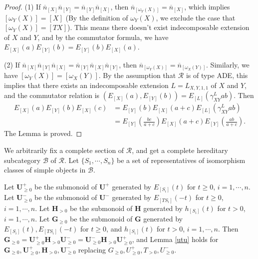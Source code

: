 \documentclass[12pt]{amsart}
\begin{document}
\begin{proof}
    (1) If $\overline{n}_{[X]}\overline{n}_{[Y]}=\overline{n}_{[Y]}\overline{n}_{[X]}$, then $\overline{n}_{[\omega_Y(X)]}=\overline{n}_{[X]}$, which implies $[\omega_Y(X)]=[X]$ (By the definition of $\omega_Y(X)$, we exclude the case that $[\omega_Y(X)]=[TX]$).
    This means there doesn't exist indecomposable extension of $X$ and $Y$, and by the commutator formula, we have $E_{[X]}(a)E_{[Y]}(b)=E_{[Y]}(b)E_{[X]}(a)$.

    (2) If $\overline{n}_{[X]}\overline{n}_{[Y]}\overline{n}_{[X]}=\overline{n}_{[Y]}\overline{n}_{[X]}\overline{n}_{[Y]}$, then $\overline{n}_{[\omega_Y(X)]}=\overline{n}_{[\omega_X(Y)]}$. 
    Similarly, we have $[\omega_Y(X)]=[\omega_X(Y)]$.
    By the assumption that $\mathcal{R}$ is of type ADE, this implies that there exists an indecomposable extension $L=L_{X,Y,1,1}$ of $X$ and $Y$, and the commutator relation is $(E_{[X]}(a),E_{[Y]}(b))=E_{[L]}(\gamma_{XY}^Lab)$. Then 
    \begin{align*}
        E_{[X]}(a) E_{[Y]}(b) E_{[X]}(c) &= E_{[Y]}(b) E_{[X]}(a+c) E_{[L]}(\gamma_{XY}^L ab)\\
         &= E_{[Y]}(\frac{bc}{a+c}) E_{[X]}(a+c) E_{[Y]}(\frac{ab}{a+c}).
    \end{align*}
    The Lemma is proved.
\end{proof}

We arbitrarily fix a complete section of $\mathcal{R}$, and get a complete hereditary subcategory $\mathcal{B}$ of $\mathcal{R}$.
Let $\{S_1,\cdots,S_n\}$ be a set of representatives of isomorphism classes of simple objects in $\mathcal{B}$.

Let $\mathbf{U}^+_{\geq 0}$ be the submonoid of $\mathbf{U}^+$ generated by $E_{[S_i]}(t)$ for $t\geq 0$, $i=1,\cdots,n$.
Let $\mathbf{U}^-_{\geq 0}$ be the submonoid of $\mathbf{U}^-$ generated by $E_{[TS_i]}(-t)$ for $t\geq 0$, $i=1,\cdots,n$.
Let $\mathbf{H}_{>0}$ be the submonoid of $\mathbf{H}$ generated by $h_{[S_i]}(t)$ for $t>0$, $i=1,\cdots,n$.
Let $\mathbf{G}_{\geq 0}$ be the submonoid of $\mathbf{G}$ generated by $E_{[S_i]}(t), E_{[TS_i]}(-t)$ for $t\geq 0$, and $h_{[S_i]}(t)$ for $t>0$, $i=1,\cdots,n$.
Then $\mathbf{G}_{\geq 0}=\mathbf{U}^+_{\geq 0}\mathbf{H}_{>0}\mathbf{U}^-_{\geq 0}=\mathbf{U}^-_{\geq 0}\mathbf{H}_{>0}\mathbf{U}^+_{\geq 0}$, and Lemma \ref{utu} holds for $\mathbf{G}_{\geq 0},\mathbf{U}^+_{\geq 0},\mathbf{H}_{>0},\mathbf{U}^-_{\geq 0}$ replacing $G_{\geq 0},U^+_{\geq 0},T_{>0},U^-_{\geq 0}$.
\end{document}
